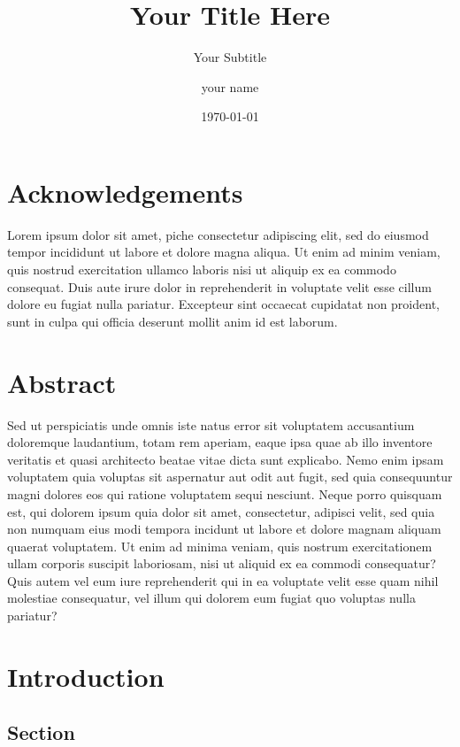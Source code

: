 \documentclass[12pt, twoside]{report}
\title{Your Title Here}
\subtitle{Your Subtitle}
\author{your name}
\date{\today}
\begin{document}
\pagestyle{empty}



\chapter*{Acknowledgements}
\noindent Lorem ipsum dolor sit amet, piche consectetur adipiscing elit, sed do eiusmod tempor incididunt ut labore et dolore magna aliqua. 
Ut enim ad minim veniam, quis nostrud exercitation ullamco laboris nisi ut aliquip ex ea commodo consequat. 
Duis aute irure dolor in reprehenderit in voluptate velit esse cillum dolore eu fugiat nulla pariatur. 
Excepteur sint occaecat cupidatat non proident, sunt in culpa qui officia deserunt mollit anim id est laborum.

\chapter*{Abstract}
\noindent Sed ut perspiciatis unde omnis iste natus error sit voluptatem accusantium doloremque laudantium, totam rem aperiam, 
eaque ipsa quae ab illo inventore veritatis et quasi architecto beatae vitae dicta sunt explicabo. 
Nemo enim ipsam voluptatem quia voluptas sit aspernatur aut odit aut fugit, sed quia consequuntur magni dolores eos qui ratione voluptatem sequi nesciunt. 
Neque porro quisquam est, qui dolorem ipsum quia dolor sit amet, consectetur, adipisci velit, sed quia non numquam eius modi tempora incidunt ut labore et dolore magnam aliquam 
quaerat voluptatem. Ut enim ad minima veniam, quis nostrum exercitationem ullam corporis suscipit laboriosam, nisi ut aliquid ex ea commodi consequatur? 
Quis autem vel eum iure reprehenderit qui in ea voluptate velit esse quam nihil molestiae consequatur, vel illum qui dolorem eum fugiat quo voluptas nulla pariatur?
\tableofcontents


\pagestyle{plain}

\chapter{Introduction}\label{chp:intro}

\section{Section}
\end{document}
